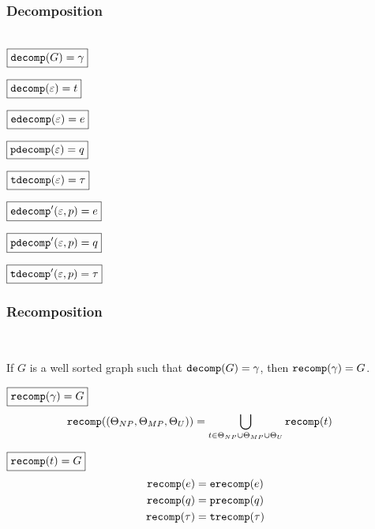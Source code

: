 
\subsubsection{Decomposition}\hspace*{\fill} \\

\noindent $\boxed{\decomp{G} = \Grove}$
%
\figureDecompositionDefDecomp

\noindent $\boxed{\decomp{\e} = t}$
%
\figureDecompositionDefDecompTerm

\noindent $\boxed{\edecomp{\e} = e}$
%
\figureDecompositionDefEdecomp

\noindent $\boxed{\pdecomp{\e} = q}$
%
\figureDecompositionDefPdecomp

\noindent $\boxed{\tdecomp{\e} = \tau}$
%
\figureDecompositionDefTdecomp

\noindent $\boxed{\edecompPrime{\e}{p} = e}$
%
\figureDecompositionDefEdecompPrime

\noindent $\boxed{\pdecompPrime{\e}{p} = q}$
%
\figureDecompositionDefPdecompPrime

\noindent $\boxed{\tdecompPrime{\e}{p} = \tau}$
%
\figureDecompositionDefTdecompPrime%


\subsubsection{Recomposition}\hspace*{\fill} \\

\begin{theorem}
  If $G$ is a well sorted graph such that $\decomp{G} = \Grove$,
  then $\recomp{\Grove} = G$.
\end{theorem}

\noindent $\boxed{\recomp{\Grove} = G}$
%
\begin{align*}
  \recomp{(\Set[NP], \Set[MP], \Set[U])} &= \bigcup_{t \in \Set[NP] \cup \Set[MP] \cup \Set[U]} \recomp{t}
\end{align*}

\noindent $\boxed{\recomp{t} = G}$
%
\begin{align*}
  \recomp{e} &= \erecomp{e} \\
  \recomp{q} &= \precomp{q} \\
  \recomp{\tau} &= \trecomp{\tau}
\end{align*}

